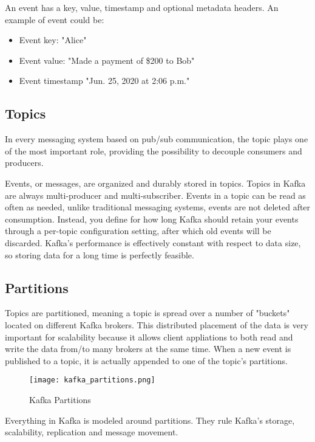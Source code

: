 An event has a key, value, timestamp and optional metadata headers. An example
of event could be:

\begin{itemize}
    \item   Event key: "Alice"
    \item   Event value: "Made a payment of \$200 to Bob"
    \item   Event timestamp "Jun. 25, 2020 at 2:06 p.m."
\end{itemize}

\subsection{Topics}

In every messaging system based on pub/sub communication, the topic plays one
of the most important role, providing the possibility to decouple consumers
and producers.

Events, or messages, are organized and durably stored in topics.
Topics in Kafka are always multi-producer and multi-subscriber.
Events in a topic can be read as often as needed, unlike traditional messaging
systems, events are not deleted after consumption. Instead, you define for how
long Kafka should retain your events through a per-topic configuration setting,
after which old events will be discarded. Kafka's performance is effectively
constant with respect to data size, so storing data for a long time is
perfectly feasible.

\subsection{Partitions}

Topics are partitioned, meaning a topic is spread over a number of "buckets"
located on different Kafka brokers.
This distributed placement of the data is very important for scalability
because it allows client appliations to both read and write the data from/to
many brokers at the same time. When a new event is published to a topic, it is
actually appended to one of the topic's partitions.

\begin{figure}[ht]
    \centering
    \texttt{[image: kafka\_partitions.png]}
    \caption{Kafka Partitions}
\end{figure}

Everything in Kafka is modeled around partitions. They rule Kafka's storage,
scalability, replication and message movement.

